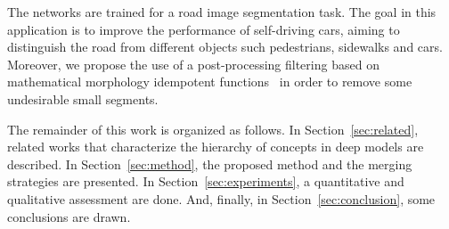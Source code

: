  

The networks are trained for a road image segmentation task. The goal in this application is to improve the performance of self-driving cars, aiming to distinguish the road from different objects such pedestrians, sidewalks and cars. Moreover, we propose the use of a post-processing filtering based on mathematical morphology idempotent functions~\cite{najman13} in order to remove some undesirable small segments.

The remainder of this work is organized as follows. In Section~\ref{sec:related}, related works that characterize the hierarchy of concepts in deep models are described. In Section~\ref{sec:method}, the proposed method and the merging strategies are presented. In Section~\ref{sec:experiments}, a quantitative and qualitative assessment are done. And, finally, in Section~\ref{sec:conclusion}, some conclusions are drawn.


